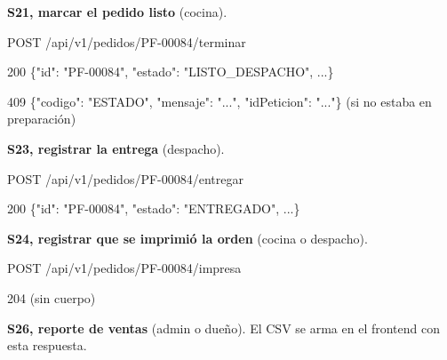 \textbf{S21, marcar el pedido listo} (cocina).


\begin{codigo}
POST /\allowbreak{}api/\allowbreak{}v1/\allowbreak{}pedidos/\allowbreak{}PF-\allowbreak{}00084/\allowbreak{}terminar\par
\end{codigo}

\begin{codigo}
200 \{"id":\allowbreak{} "PF-\allowbreak{}00084",\allowbreak{} "estado":\allowbreak{} "LISTO\_\allowbreak{}DESPACHO",\allowbreak{} .\allowbreak{}.\allowbreak{}.\allowbreak{}\}\par
409 \{"codigo":\allowbreak{} "ESTADO",\allowbreak{} "mensaje":\allowbreak{} ".\allowbreak{}.\allowbreak{}.\allowbreak{}",\allowbreak{} "idPeticion":\allowbreak{} ".\allowbreak{}.\allowbreak{}.\allowbreak{}"\}   (\allowbreak{}si no estaba en preparación)\par
\end{codigo}

\textbf{S23, registrar la entrega} (despacho).


\begin{codigo}
POST /\allowbreak{}api/\allowbreak{}v1/\allowbreak{}pedidos/\allowbreak{}PF-\allowbreak{}00084/\allowbreak{}entregar\par
\end{codigo}

\begin{codigo}
200 \{"id":\allowbreak{} "PF-\allowbreak{}00084",\allowbreak{} "estado":\allowbreak{} "ENTREGADO",\allowbreak{} .\allowbreak{}.\allowbreak{}.\allowbreak{}\}\par
\end{codigo}

\textbf{S24, registrar que se imprimió la orden} (cocina o despacho).


\begin{codigo}
POST /\allowbreak{}api/\allowbreak{}v1/\allowbreak{}pedidos/\allowbreak{}PF-\allowbreak{}00084/\allowbreak{}impresa\par
\end{codigo}

\begin{codigo}
204 (\allowbreak{}sin cuerpo)\par
\end{codigo}

\textbf{S26, reporte de ventas} (admin o dueño). El CSV se arma en el frontend con esta respuesta.


